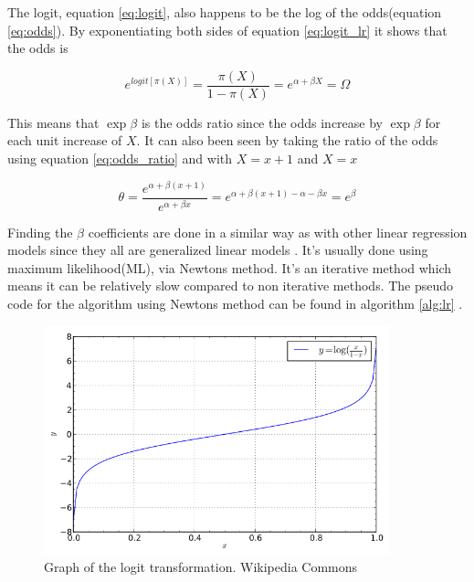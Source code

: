 \documentclass[10pt,a4paper]{report}
\begin{document}
The logit, equation \ref{eq:logit}, also happens to be the log of the odds(equation \ref{eq:odds})\cite{agresti_categorical}. By exponentiating both sides of equation \ref{eq:logit_lr} it shows that the odds is \cite{agresti_categorical}

\begin{equation}
e^{logit[\pi(X)]}=\frac{\pi(X)}{1-\pi(X)}=e^{\alpha+\beta X}=\Omega
\end{equation}

This means that $\exp{\beta}$ is the odds ratio since the odds increase by $\exp{\beta}$ for each unit increase of $X$\cite{agresti_categorical}. It can also been seen by taking the ratio of the odds using equation \ref{eq:odds_ratio} and  with $X=x+1$ and $X=x$

\begin{equation}
\theta=\frac{e^{\alpha+\beta (x+1)}}{e^{\alpha+\beta x}}=e^{\alpha+\beta (x+1)-\alpha-\beta x}=e^{\beta}
\end{equation}

Finding the $\beta$ coefficients are done in a similar way as with other linear regression models since they all are generalized linear models \cite{agresti_categorical}. It's usually done using  maximum likelihood(ML), via Newtons method\cite{agresti_categorical, uvehag_master_thesis}. It's an iterative method which means it can be relatively slow compared to non iterative methods. The pseudo code for the algorithm using Newtons method can be found in algorithm \ref{alg:lr} \cite{uvehag_master_thesis}.

\begin{figure}[h]
    \centering
    \includegraphics[width=10cm]{logit.png}
    \caption{Graph of the logit transformation. Wikipedia Commons}
    \label{fig:logit}
\end{figure}
\end{document}
